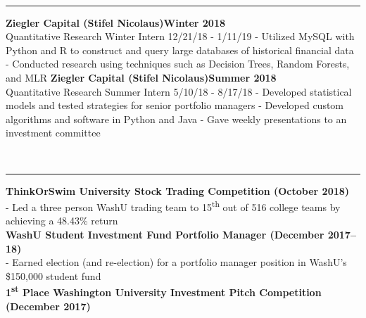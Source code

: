 \documentclass[12pt]{article}
\begin{document}
\begin{titlepage}
\begin{addmargin}[1em]{0em}
\begin{center}
\begin{minipage}[b]{0.3\textwidth}
				\end{minipage}
			\end{center}
		\end{addmargin}
		\vspace{-10pt}
		\noindent
		\\\rule{\textwidth}{0.4pt}
		\begin{addmargin}[1em]{0em}
			\textbf{Ziegler Capital (Stifel Nicolaus)\hfill Winter 2018}\\
Quantitative Research Winter Intern \hfill {\small{12/21/18 - 1/11/19}}\newline
- Utilized MySQL with Python and R to construct and query large databases of historical financial data \newline
- Conducted research using techniques such as Decision Trees, Random Forests, and MLR\newline
			\textbf{Ziegler Capital (Stifel Nicolaus)\hfill Summer 2018}\\
Quantitative Research Summer Intern \hfill {\small{5/10/18 - 8/17/18}}\newline
- Developed statistical models and tested strategies for senior portfolio managers\newline
- Developed custom algorithms and software in Python and Java\newline
- Gave weekly presentations to an investment committee\newline
		\end{addmargin}
		\vspace{-10pt}
		\noindent
		\\\rule{\textwidth}{0.4pt}
		\begin{addmargin}[1em]{0em}
			\textbf{ThinkOrSwim University Stock Trading Competition \hfill (October 2018)}\\
- Led a three person WashU trading team to 15\textsuperscript{th} out of 516 college teams by achieving a 48.43\% return\\
			\textbf{WashU Student Investment Fund Portfolio Manager \hfill (December 2017–18)}\\
- Earned election (and re-election) for a portfolio manager position in WashU's \$150,000 student fund\\
			\textbf{1\textsuperscript{st} Place Washington University Investment Pitch Competition \hfill (December 2017)}\\

\end{addmargin}
\end{titlepage}
\end{document}
